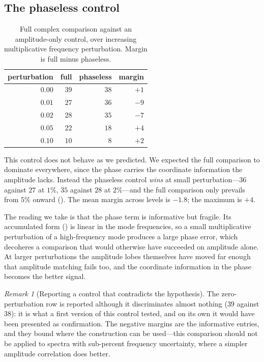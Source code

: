 \documentclass[11pt,twocolumn,a4paper]{article}
\theoremstyle{upthm}
\theoremstyle{definition}
\theoremstyle{remark}
\newtheorem{remark}[theorem]{Remark}
\begin{document}
\subsection{The phaseless control}
\label{sec:control}

\begin{table}[htbp]
\centering\small
\caption{Full complex comparison against an amplitude-only control, over
increasing multiplicative frequency perturbation. Margin is full minus
phaseless.}
\label{tab:control}
\begin{tabular}{@{}rrrr@{}}
\toprule
perturbation & full & phaseless & margin\\
\midrule
$0.00$ & $39$ & $38$ & $+1$\\
$0.01$ & $27$ & $36$ & $-9$\\
$0.02$ & $28$ & $35$ & $-7$\\
$0.05$ & $22$ & $18$ & $+4$\\
$0.10$ & $10$ & $8$  & $+2$\\
\bottomrule
\end{tabular}
\end{table}

This control does not behave as we predicted. We expected the full
comparison to dominate everywhere, since the phase carries the coordinate
information the amplitude lacks. Instead the phaseless control
\emph{wins} at small perturbation---$36$ against $27$ at $1\%$, $35$
against $28$ at $2\%$---and the full comparison only prevails from $5\%$
onward (). The mean margin across levels is $-1.8$;
the maximum is $+4$.

The reading we take is that the phase term is informative but fragile.
Its accumulated form () is linear in the mode frequencies,
so a small multiplicative perturbation of a high-frequency mode produces
a large phase error, which decoheres a comparison that would otherwise
have succeeded on amplitude alone. At larger perturbations the amplitude
lobes themselves have moved far enough that amplitude matching fails too,
and the coordinate information in the phase becomes the better signal.

\begin{remark}[Reporting a control that contradicts the hypothesis]
\label{rem:controlhonest}
The zero-perturbation row is reported although it discriminates almost
nothing ($39$ against $38$): it is what a first version of this control
tested, and on its own it would have been presented as confirmation.
The negative margins are the informative entries, and they bound where
the construction can be used---this comparison should not be applied to
spectra with sub-percent frequency uncertainty, where a simpler
amplitude correlation does better.
\end{remark}
\end{document}

